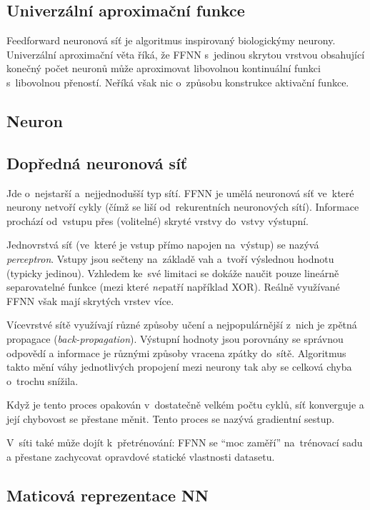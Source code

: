 \subsection{Univerzální aproximační funkce}

Feedforward neuronová síť je algoritmus inspirovaný biologickýmy neurony.
Univerzální aproximační věta říká, že FFNN s~jedinou skrytou vrstvou obsahující konečný počet neuronů může aproximovat libovolnou kontinuální funkci s~libovolnou přeností.
Neříká však nic o~způsobu konstrukce aktivační funkce.

\subsection{Neuron}

\subsection{Dopředná neuronová síť}

Jde o~nejstarší a~nejjednodušší typ sítí.
FFNN je umělá neuronová síť ve~které neurony netvoří cykly (čímž se liší od~rekurentních neuronových sítí).
Informace prochází od~vstupu přes (volitelné) skryté vrstvy do~vstvy výstupní.

Jednovrstvá síť (ve~které je vstup přímo napojen na~výstup) se nazývá \emph{perceptron}.
Vstupy jsou sečteny na~základě vah a~tvoří výslednou hodnotu (typicky jedinou).
Vzhledem ke~své limitaci se dokáže naučit pouze lineárně separovatelné funkce (mezi které \emph{ne}patří například XOR).
Reálně využívané FFNN však mají skrytých vrstev více.

Vícevrstvé sítě využívají různé způsoby učení a nejpopulárnější z~nich je zpětná propagace (\emph{back-propagation}).
Výstupní hodnoty jsou porovnány se správnou odpovědí a informace je různými způsoby vracena zpátky do~sítě.
Algoritmus takto mění váhy jednotlivých propojení mezi neurony tak aby se celková chyba o~trochu snížila.

Když je tento proces opakován v~dostatečně velkém počtu cyklů, síť konverguje a její chybovost se přestane měnit.
Tento proces se nazývá gradientní sestup.

V~síti také může dojít k~přetrénování: FFNN se \enquote{moc zaměří} na~trénovací sadu a přestane zachycovat opravdové statické vlastnosti datasetu.

\subsection{Maticová reprezentace NN}

